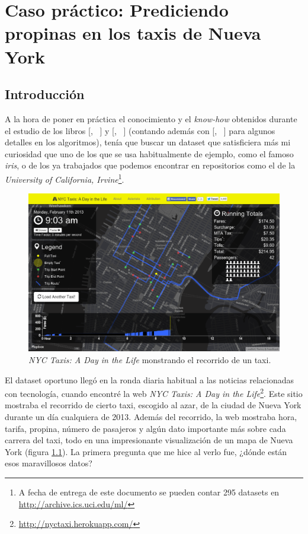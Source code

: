 \chapter{Caso práctico: Prediciendo propinas en los taxis de Nueva York} \label{chap:5}

\vspace*{5mm}

\section{Introducción} \label{sec:5.1}

A la hora de poner en práctica el conocimiento y el \emph{know-how} obtenidos durante el estudio de los libros [\citeauthor{richert2013building}, ~\citeyear{richert2013building}] y [\citeauthor{abu2012learning}, ~\citeyear{abu2012learning}] (contando además con [\citeauthor{russell2003artificial}, ~\citeyear{russell2003artificial}] para algunos detalles en los algoritmos), tenía que buscar un dataset que satisficiera más mi curiosidad que uno de los que se usa habitualmente de ejemplo, como el famoso \emph{iris}, o de los ya trabajados que podemos encontrar en repositorios como el de la \emph{University of California, Irvine}\footnote{A fecha de entrega de este documento se pueden contar 295 datasets en \url{http://archive.ics.uci.edu/ml/}}.

\begin{figure}[ht]
  \centering
  \includegraphics[width=140mm]{figures/ch_05/nyc_taxis_a_day_in_the_life.png}
  \caption{\emph{NYC Taxis: A Day in the Life} monstrando el recorrido de un taxi.}
  \label{fig:5.1}
\end{figure}

El dataset oportuno llegó en la ronda diaria habitual a las noticias relacionadas con tecnología, cuando encontré la web \emph{NYC Taxis: A Day in the Life}\footnote{\url{http://nyctaxi.herokuapp.com/}}. Este sitio mostraba el recorrido de cierto taxi, escogido al azar, de la ciudad de Nueva York durante un día cualquiera de 2013. Además del recorrido, la web mostraba hora, tarifa, propina, número de pasajeros y algún dato importante más sobre cada carrera del taxi, todo en una impresionante visualización de un mapa de Nueva York (figura \ref{fig:5.1}). La primera pregunta que me hice al verlo fue, ¿dónde están esos maravillosos datos?

